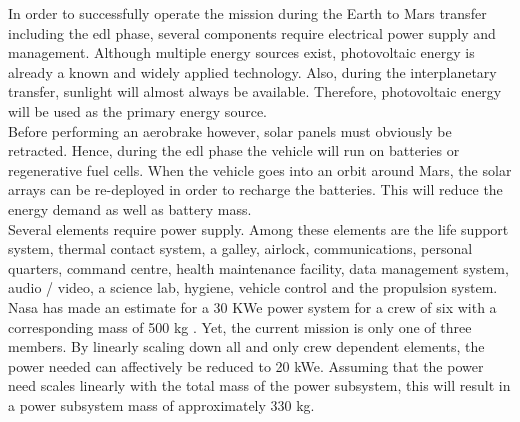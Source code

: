 In order to successfully operate the mission during the Earth to Mars transfer including the \gls{edl} phase, several components require electrical power supply and management. Although multiple  energy sources exist, photovoltaic energy is already a known and widely applied technology. Also, during the interplanetary transfer, sunlight will almost always be available. Therefore, photovoltaic energy will be used as the primary energy source.\\
 
Before performing an aerobrake however, solar panels must obviously be retracted. Hence, during the \gls{edl} phase the vehicle will run on batteries or regenerative fuel cells. When the vehicle goes into an orbit around Mars, the solar arrays can be re-deployed in order to recharge the batteries. This will reduce the energy demand as well as battery mass.\\

Several elements require power supply. Among these elements are the life support system, thermal contact system, a galley, airlock, communications, personal quarters, command centre, health maintenance facility, data management system, audio / video, a science lab, hygiene, vehicle control and the propulsion system. Nasa has made an estimate for a 30 KWe power system for a crew of six with a corresponding mass of 500 kg \cite{Hoffman1997}. Yet, the current mission is only one of three members. By linearly scaling down all and only crew dependent elements, the power needed can affectively be reduced to 20 kWe. Assuming that the power need scales linearly with the total mass of the power subsystem, this will result in a power subsystem mass of approximately 330 kg.\\







